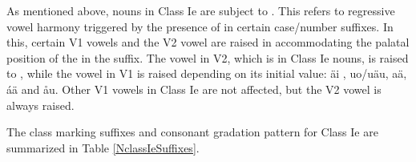 As mentioned above, nouns in Class Ie are subject to \jvh. This refers to regressive vowel harmony triggered by the presence of  in certain case/number suffixes. In this, certain V1 vowels and the V2 vowel are raised in accommodating the palatal position of the  in the suffix. The vowel in V2, which is  in Class Ie nouns, is raised to , while the vowel in V1 is raised depending on its initial value: ä\ARROW i%
, uo/uä\ARROW u, %
a\ARROW ä,  á\ARROW ä and å\ARROW u. Other V1 vowels in Class Ie are not affected, but the V2 vowel is always raised. %


The class marking suffixes and consonant gradation pattern for Class Ie are summarized in Table \vref{NclassIeSuffixes}. %


